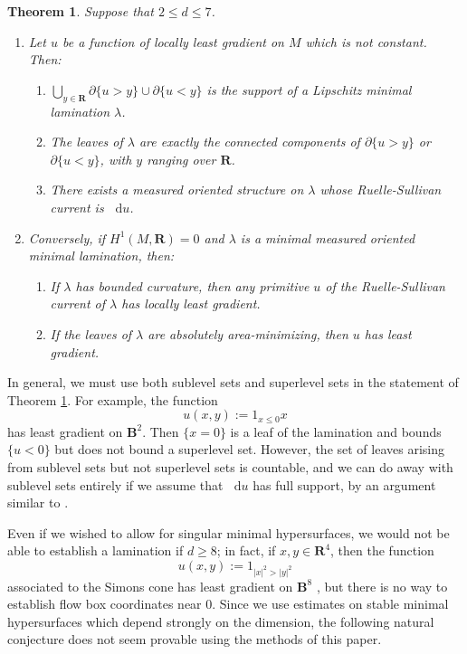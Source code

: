 \documentclass[reqno,11pt]{amsart}
\newcommand{\RR}{\mathbf{R}}
\newcommand{\Ball}{\mathbf{B}}
\newcommand*\dif{\mathop{}\!\mathrm{d}}
\newtheorem{mainthm}{Theorem}
\theoremstyle{definition}
\numberwithin{equation}{section}
\begin{document}
\begin{mainthm}\label{main thm}
Suppose that $2 \leq d \leq 7$.
\begin{enumerate}
\item Let $u$ be a function of locally least gradient on $M$ which is not constant.
Then:
\begin{enumerate}
\item $\bigcup_{y \in \RR} \partial \{u > y\} \cup \partial \{u < y\}$ is the support of a Lipschitz minimal lamination $\lambda$.
\item The leaves of $\lambda$ are exactly the connected components of $\partial \{u > y\}$ or $\partial \{u < y\}$, with $y$ ranging over $\RR$.
\item There exists a measured oriented structure on $\lambda$ whose Ruelle-Sullivan current is $\dif u$.
\end{enumerate}
\item Conversely, if $H^1(M, \RR) = 0$ and $\lambda$ is a minimal measured oriented minimal lamination, then:
\begin{enumerate}
\item If $\lambda$ has bounded curvature, then any primitive $u$ of the Ruelle-Sullivan current of $\lambda$ has locally least gradient.
\item If the leaves of $\lambda$ are absolutely area-minimizing, then $u$ has least gradient.
\end{enumerate}
\end{enumerate}
\end{mainthm}

In general, we must use both sublevel sets and superlevel sets in the statement of Theorem \ref{main thm}.
For example, the function
$$u(x, y) := 1_{x \leq 0} x$$
has least gradient on $\Ball^2$.
Then $\{x = 0\}$ is a leaf of the lamination and bounds $\{u < 0\}$ but does not bound a superlevel set.
However, the set of leaves arising from sublevel sets but not superlevel sets is countable, and we can do away with sublevel sets entirely if we assume that $\dif u$ has full support, by an argument similar to \cite[Lemma 2.11]{górny2018}.

Even if we wished to allow for singular minimal hypersurfaces, we would not be able to establish a lamination if $d \geq 8$; in fact, if $x, y \in \RR^4$, then the function
$$u(x, y) := 1_{|x|^2 > |y|^2}$$
associated to the Simons cone has least gradient on $\Ball^8$ \cite[Theorem A]{BOMBIERI1969}, but there is no way to establish flow box coordinates near $0$.
Since we use estimates on stable minimal hypersurfaces which depend strongly on the dimension, the following natural conjecture does not seem provable using the methods of this paper.
\end{document}
